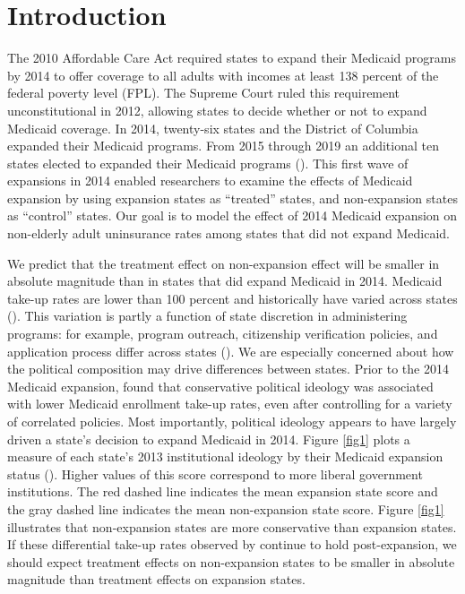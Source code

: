 \documentclass[12pt]{article}
\def\spacingset#1{\renewcommand{\baselinestretch}%
{#1}\small\normalsize} \spacingset{1}
\begin{document}
\newpage
\spacingset{1.45} %

\maketitle

\section{Introduction}

The 2010 Affordable Care Act required states to expand their Medicaid programs by 2014 to offer coverage to all adults with incomes at least 138 percent of the federal poverty level (FPL). The Supreme Court ruled this requirement unconstitutional in 2012, allowing states to decide whether or not to expand Medicaid coverage. In 2014, twenty-six states and the District of Columbia expanded their Medicaid programs. From 2015 through 2019 an additional ten states elected to expanded their Medicaid programs (\cite{KFF}). This first wave of expansions in 2014 enabled researchers to examine the effects of Medicaid expansion by using expansion states as ``treated'' states, and non-expansion states as ``control'' states. Our goal is to model the effect of 2014 Medicaid expansion on non-elderly adult uninsurance rates among states that did not expand Medicaid. 

We predict that the treatment effect on non-expansion effect will be smaller in absolute magnitude than in states that did expand Medicaid in 2014. Medicaid take-up rates are lower than 100 percent and historically have varied across states (\cite{sommers2012understanding}). This variation is partly a function of state discretion in administering programs: for example, program outreach, citizenship verification policies, and application process differ across states (\cite{courtemanche2017early}). We are especially concerned about how the political composition may drive differences between states. Prior to the 2014 Medicaid expansion, \cite{sommers2012understanding} found that conservative political ideology was associated with lower Medicaid enrollment take-up rates, even after controlling for a variety of correlated policies. Most importantly, political ideology appears to have largely driven a state's decision to expand Medicaid in 2014. Figure \ref{fig1} plots a measure of each state's 2013 institutional ideology by their Medicaid expansion status (\cite{fording}). Higher values of this score correspond to more liberal government institutions. The red dashed line indicates the mean expansion state score and the gray dashed line indicates the mean non-expansion state score. Figure \ref{fig1} illustrates that non-expansion states are more conservative than expansion states.  If these differential take-up rates observed by \cite{sommers2012understanding} continue to hold post-expansion, we should expect treatment effects on non-expansion states to be smaller in absolute magnitude than treatment effects on expansion states. 
\end{document}
